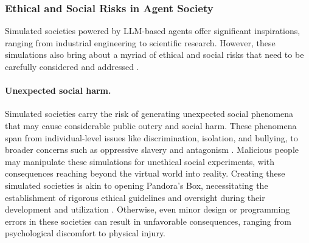 \subsubsection{Ethical and Social Risks in Agent Society} \label{sec:potential ethical and social risks}
Simulated societies powered by LLM-based agents offer significant inspirations, ranging from industrial engineering to scientific research.
However, these simulations also bring about a myriad of ethical and social risks that need to be carefully considered and addressed \cite{DBLP:journals/intpolrev/HelbergerD23}. 

\paragraph{Unexpected social harm.}
Simulated societies carry the risk of generating unexpected social phenomena that may cause considerable public outcry and social harm. 
These phenomena span from individual-level issues like discrimination, isolation, and bullying, to broader concerns such as oppressive slavery and antagonism \cite{DBLP:journals/corr/abs-2112-04359, DBLP:journals/corr/abs-2304-05335}.
Malicious people may manipulate these simulations for unethical social experiments, with consequences reaching beyond the virtual world into reality.
Creating these simulated societies is akin to opening Pandora's Box, necessitating the establishment of rigorous ethical guidelines and oversight during their development and utilization \cite{DBLP:journals/intpolrev/HelbergerD23}.
Otherwise, even minor design or programming errors in these societies can result in unfavorable consequences, ranging from psychological discomfort to physical injury.

